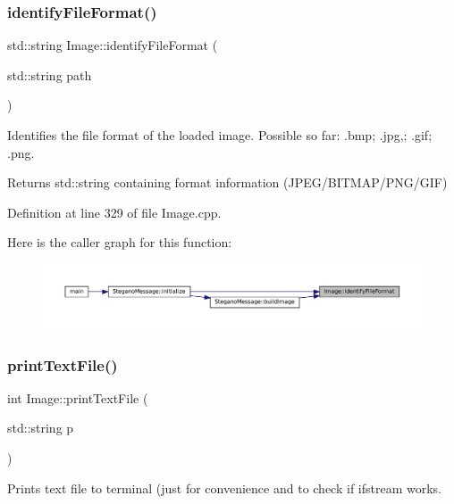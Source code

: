 \subsubsection{\texorpdfstring{identifyFileFormat()}{identifyFileFormat()}}
{\footnotesize\ttfamily std\+::string Image\+::identify\+File\+Format (\begin{DoxyParamCaption}\item[{std\+::string}]{path }\end{DoxyParamCaption})\hspace{0.3cm}{\ttfamily [static]}}



Identifies the file format of the loaded image. Possible so far\+: .bmp; .jpg,; .gif; .png. 

\begin{DoxyReturn}{Returns}
std\+::string containing format information (J\+P\+E\+G/\+B\+I\+T\+M\+A\+P/\+P\+N\+G/\+G\+IF) 
\end{DoxyReturn}


Definition at line 329 of file Image.\+cpp.

Here is the caller graph for this function\+:\nopagebreak
\begin{figure}[H]
\begin{center}
\leavevmode
\includegraphics[width=350pt]{classImage_ac4e8db14cfd60a6a7085e6fcb83488a4_icgraph}
\end{center}
\end{figure}
\mbox{\label{classImage_ae5daf791502caefeae1b15360d354513}} 
\subsubsection{\texorpdfstring{printTextFile()}{printTextFile()}}
{\footnotesize\ttfamily int Image\+::print\+Text\+File (\begin{DoxyParamCaption}\item[{std\+::string}]{p }\end{DoxyParamCaption})}



Prints text file to terminal (just for convenience and to check if ifstream works. 


